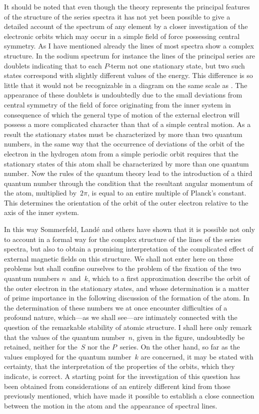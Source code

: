 It should be noted that even though the theory represents the
principal features of the structure of the series spectra it has not
yet been possible to give a detailed account of the spectrum of any
element by a closer investigation of the electronic orbits which may
occur in a simple field of force possessing central symmetry. As
I have mentioned already the lines of most spectra show a complex
structure. In the sodium spectrum for instance the lines of the
principal series are doublets indicating that to each $P$-term not
one stationary state, but two such states correspond with slightly
different values of the energy. This difference is so little that
it would not be recognizable in a diagram on the same scale as
. The appearance of these doublets is undoubtedly due to
the small deviations from central symmetry of the field of force
originating from the inner system in consequence of which the
general type of motion of the external electron will possess a
more complicated character than that of a simple central motion.
As a result the stationary states must be characterized by more
than two quantum numbers, in the same way that the occurrence
of deviations of the orbit of the electron in the hydrogen atom from
a simple periodic orbit requires that the stationary states of this
atom shall be characterized by more than one quantum number.
Now the rules of the quantum theory lead to the introduction of
a third quantum number through the condition that the resultant
angular momentum of the atom, multiplied by~$2\pi$, is equal to an
entire multiple of Planck's constant. This determines the orientation
of the orbit of the outer electron relative to the axis of the
inner system.

In this way Sommerfeld, Landé and others have shown that it
is possible not only to account in a formal way for the complex
structure of the lines of the series spectra, but also to obtain a
promising interpretation of the complicated effect of external
magnetic fields on this structure. We shall not enter here on these
problems but shall confine ourselves to the problem of the fixation
of the two quantum numbers $n$~and~$k$, which to a first approximation
describe the orbit of the outer electron in the stationary
states, and whose determination is a matter of prime importance
in the following discussion of the formation of the atom. In
the determination of these numbers we at once encounter difficulties
of a profound nature, which---as we shall see---are intimately
connected with the question of the remarkable stability of atomic
structure. I shall here only remark that the values of the quantum
number~$n$, given in the figure, undoubtedly  be retained,
neither for the~$S$ nor the $P$~series. On the other hand, so far as
the values employed for the quantum number~$k$ are concerned, it
may be stated with certainty, that the interpretation of the properties
of the orbits, which they indicate, is correct. A starting
point for the investigation of this question has been obtained from
considerations of an entirely different kind from those previously
mentioned, which have made it possible to establish a close connection
between the motion in the atom and the appearance of
spectral lines.

